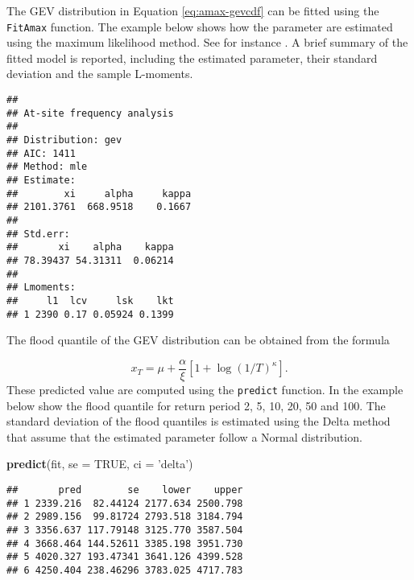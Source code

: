 \documentclass[]{book}
\newenvironment{Shaded}{\begin{snugshade}}{\end{snugshade}}
\newcommand{\DataTypeTok}[1]{\textcolor[rgb]{0.13,0.29,0.53}{#1}}
\newcommand{\KeywordTok}[1]{\textcolor[rgb]{0.13,0.29,0.53}{\textbf{#1}}}
\newcommand{\NormalTok}[1]{#1}
\newcommand{\OperatorTok}[1]{\textcolor[rgb]{0.81,0.36,0.00}{\textbf{#1}}}
\newcommand{\OtherTok}[1]{\textcolor[rgb]{0.56,0.35,0.01}{#1}}
\newcommand{\StringTok}[1]{\textcolor[rgb]{0.31,0.60,0.02}{#1}}
\theoremstyle{definition}
\theoremstyle{definition}
\theoremstyle{definition}
\theoremstyle{remark}
\begin{document}
The GEV distribution in Equation \eqref{eq:amax-gevcdf} can be fitted
using the \texttt{FitAmax} function. The example below shows how the
parameter are estimated using the maximum likelihood method. See for
instance \citep{coles_introduction_2001}. A brief summary of the fitted
model is reported, including the estimated parameter, their standard
deviation and the sample L-moments.

\begin{Shaded}
\end{Shaded}

\begin{verbatim}
## 
## At-site frequency analysis
## 
## Distribution: gev 
## AIC: 1411 
## Method: mle
## Estimate:
##        xi     alpha     kappa 
## 2101.3761  668.9518    0.1667 
## 
## Std.err:
##       xi    alpha    kappa 
## 78.39437 54.31311  0.06214 
## 
## Lmoments:
##     l1  lcv     lsk    lkt
## 1 2390 0.17 0.05924 0.1399
\end{verbatim}

The flood quantile of the GEV distribution can be obtained from the
formula

\[
x_T = \mu + \frac{\alpha}{\xi}\left[ 1+\log(1/T)^\kappa \right] .
\] These predicted value are computed using the \texttt{predict}
function. In the example below show the flood quantile for return period
2, 5, 10, 20, 50 and 100. The standard deviation of the flood quantiles
is estimated using the Delta method that assume that the estimated
parameter follow a Normal distribution.

\begin{Shaded}
\begin{Highlighting}[]
\KeywordTok{predict}\NormalTok{(fit, }\DataTypeTok{se =} \OtherTok{TRUE}\NormalTok{, }\DataTypeTok{ci =} \StringTok{'delta'}\NormalTok{)}
\end{Highlighting}
\end{Shaded}

\begin{verbatim}
##       pred        se    lower    upper
## 1 2339.216  82.44124 2177.634 2500.798
## 2 2989.156  99.81724 2793.518 3184.794
## 3 3356.637 117.79148 3125.770 3587.504
## 4 3668.464 144.52611 3385.198 3951.730
## 5 4020.327 193.47341 3641.126 4399.528
## 6 4250.404 238.46296 3783.025 4717.783
\end{verbatim}
\end{document}
